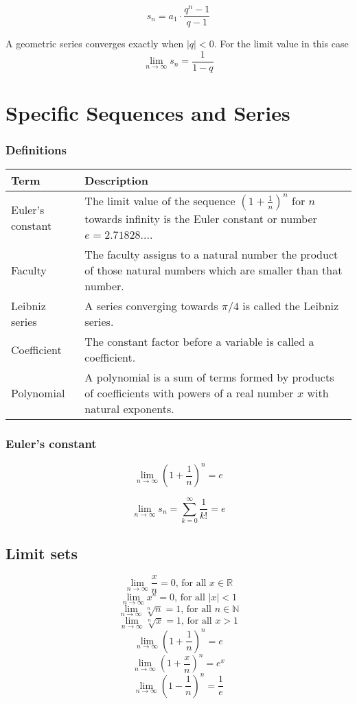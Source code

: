 \documentclass{book}
\begin{document}
\[
  s_{n} = a_{1}\cdot\frac{q^{n}-1}{q-1}
\]

A geometric series converges exactly when $|q|<0$. For the limit value in this case
\[
  \lim\limits_{n\to\infty}s_{n} = \frac{1}{1-q}
\]

\section{Specific Sequences and Series}
\subsubsection{Definitions}
\begin{tabular}{p{3cm}p{10.5cm}}
  \toprule
  \textbf{Term} & \textbf{Description} \\
  \midrule
  Euler's constant & The limit value of the sequence $\left(1+\frac{1}{n}\right)^{n}$ for $n$ towards infinity is the Euler constant or number $e = 2.71828...$.\\
  \midrule
  Faculty & The faculty assigns to a natural number the product of those natural numbers which are smaller than that number.\\
  \midrule
  Leibniz series & A series converging towards $\pi/4$ is called the Leibniz series.\\
  \midrule
  Coefficient & The constant factor before a variable is called a coefficient.\\
  \midrule
  Polynomial & A polynomial is a sum of terms formed by products of coefficients with powers of a real number $x$ with natural exponents.\\ 
  \bottomrule
\end{tabular}

\subsubsection{Euler's constant}
\[
  \lim\limits_{n\to\infty}\left(1+\frac{1}{n}\right)^{n}=e
\]

\[
  \lim\limits_{n\to\infty}s_{n}=\sum_{k=0}^{\infty}\frac{1}{k!}=e
\]

\subsection{Limit sets}
\[
  \lim\limits_{n\to \infty} \frac{x}{n}=0\text{, for all }x\in\mathbb{R}
\]
\[
  \lim\limits_{n\to \infty} x^n=0\text{, for all }|x|<1
\]
\[
  \lim\limits_{n\to \infty} \sqrt[n]{n}=1\text{, for all }n\in\mathbb{N}
\]
\[
  \lim\limits_{n\to \infty} \sqrt[n]{x}=1\text{, for all }x>1
\]
\[
  \lim\limits_{n\to \infty} \left(1+\frac{1}{n}\right)^n=e
\]
\[
  \lim\limits_{n\to \infty} \left(1+\frac{x}{n}\right)^n=e^x
\]
\[
  \lim\limits_{n\to \infty} \left(1-\frac{1}{n}\right)^n=\frac{1}{e}
\]
\end{document}
